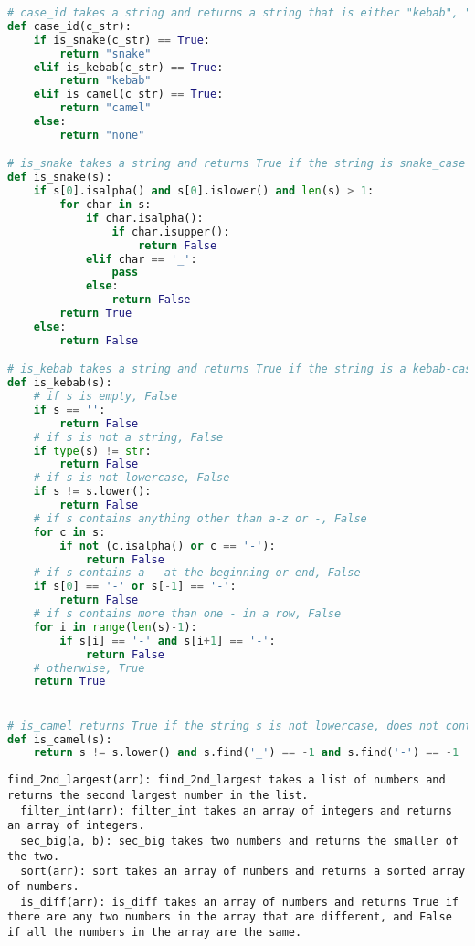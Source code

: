\begin{figure*}
\begin{lstlisting}[language=Python]
# case_id takes a string and returns a string that is either "kebab", "snake", "camel", or "none" depending on whether the input string is in kebab case, snake case, camel case, or none of the above.
def case_id(c_str):
    if is_snake(c_str) == True:
        return "snake"
    elif is_kebab(c_str) == True:
        return "kebab"
    elif is_camel(c_str) == True:
        return "camel"
    else:
        return "none"

# is_snake takes a string and returns True if the string is snake_case and False otherwise.
def is_snake(s):
    if s[0].isalpha() and s[0].islower() and len(s) > 1:
        for char in s:
            if char.isalpha():
                if char.isupper():
                    return False
            elif char == '_':
                pass
            else:
                return False
        return True
    else:
        return False

# is_kebab takes a string and returns True if the string is a kebab-case string, and False otherwise.
def is_kebab(s):
    # if s is empty, False
    if s == '':
        return False
    # if s is not a string, False
    if type(s) != str:
        return False
    # if s is not lowercase, False
    if s != s.lower():
        return False
    # if s contains anything other than a-z or -, False
    for c in s:
        if not (c.isalpha() or c == '-'):
            return False
    # if s contains a - at the beginning or end, False
    if s[0] == '-' or s[-1] == '-':
        return False
    # if s contains more than one - in a row, False
    for i in range(len(s)-1):
        if s[i] == '-' and s[i+1] == '-':
            return False
    # otherwise, True
    return True


# is_camel returns True if the string s is not lowercase, does not contain dashes, and does not contain underscores.
def is_camel(s):
    return s != s.lower() and s.find('_') == -1 and s.find('-') == -1
\end{lstlisting}
\caption{Train Problem 2892, Solution 7}
\end{figure*}

\begin{figure*}
\begin{lstlisting}
find_2nd_largest(arr): find_2nd_largest takes a list of numbers and returns the second largest number in the list.
  filter_int(arr): filter_int takes an array of integers and returns an array of integers.
  sec_big(a, b): sec_big takes two numbers and returns the smaller of the two.
  sort(arr): sort takes an array of numbers and returns a sorted array of numbers.
  is_diff(arr): is_diff takes an array of numbers and returns True if there are any two numbers in the array that are different, and False if all the numbers in the array are the same.
\end{lstlisting}
\caption{Train Problem 3090, Solution 9}
\end{figure*}

